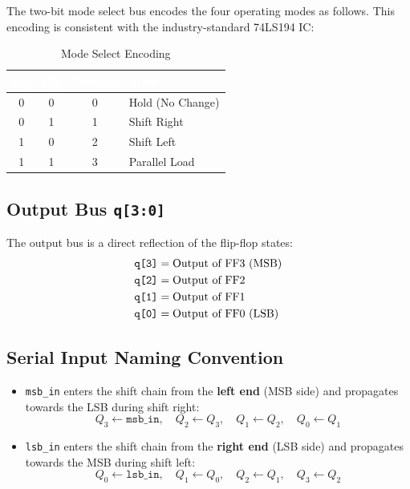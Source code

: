 \documentclass[12pt,a4paper]{report}
\newcommand{\signal}[1]{\texttt{\textcolor{codeblue}{#1}}}
\begin{document}
The two-bit mode select bus encodes the four operating modes as follows. This encoding is consistent with the industry-standard 74LS194 IC:

\begin{table}[H]
    \centering
    \caption{Mode Select Encoding}
    \begin{tabular}{cccl}
        \toprule
        \rowcolor{tableheader}
        \textcolor{white}{\textbf{s[1]}} &
        \textcolor{white}{\textbf{s[0]}} &
        \textcolor{white}{\textbf{Decimal}} &
        \textcolor{white}{\textbf{Mode}} \\
        \midrule
        0 & 0 & 0 & Hold (No Change) \\
        0 & 1 & 1 & Shift Right \\
        1 & 0 & 2 & Shift Left \\
        1 & 1 & 3 & Parallel Load \\
        \bottomrule
    \end{tabular}
    \label{tab:modeselect}
\end{table}

\subsection{Output Bus \texttt{q[3:0]}}

The output bus is a direct reflection of the flip-flop states:
\begin{align}
    \texttt{q[3]} &= \text{Output of FF3 (MSB)} \notag \\
    \texttt{q[2]} &= \text{Output of FF2} \notag \\
    \texttt{q[1]} &= \text{Output of FF1} \notag \\
    \texttt{q[0]} &= \text{Output of FF0 (LSB)} \notag
\end{align}

\subsection{Serial Input Naming Convention}

\begin{itemize}
    \item \signal{msb\_in} enters the shift chain from the \textbf{left end} (MSB side) and propagates towards the LSB during shift right: \[Q_3 \leftarrow \texttt{msb\_in}, \quad Q_2 \leftarrow Q_3, \quad Q_1 \leftarrow Q_2, \quad Q_0 \leftarrow Q_1\]
    \item \signal{lsb\_in} enters the shift chain from the \textbf{right end} (LSB side) and propagates towards the MSB during shift left: \[Q_0 \leftarrow \texttt{lsb\_in}, \quad Q_1 \leftarrow Q_0, \quad Q_2 \leftarrow Q_1, \quad Q_3 \leftarrow Q_2\]
\end{itemize}
\end{document}
